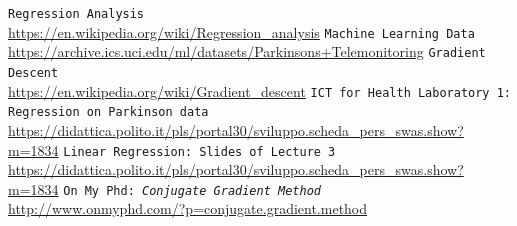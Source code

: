 \documentclass[12pt]{report}
\begin{document}
\begin{table}[]\label{hello}
\caption{Final results in terms of MSE and Number of Iterations for Training, Testing and Validation Data}
\end{table}



\pagebreak


\begin{thebibliography}{99}
 \texttt{Regression Analysis}\\\url{https://en.wikipedia.org/wiki/Regression_analysis}
 \texttt{Machine Learning Data}\\\url{https://archive.ics.uci.edu/ml/datasets/Parkinsons+Telemonitoring}
 \texttt{Gradient Descent}\\\url{https://en.wikipedia.org/wiki/Gradient_descent}
 \texttt{ICT for Health Laboratory 1: Regression on Parkinson data}\\\url{https://didattica.polito.it/pls/portal30/sviluppo.scheda_pers_swas.show?m=1834}
 \texttt{Linear Regression: Slides of Lecture 3}\\ \url{https://didattica.polito.it/pls/portal30/sviluppo.scheda_pers_swas.show?m=1834}
 \texttt{On My Phd:\textit{ Conjugate Gradient Method}}\\ \url{http://www.onmyphd.com/?p=conjugate.gradient.method}
\end{thebibliography}
\end{document}
